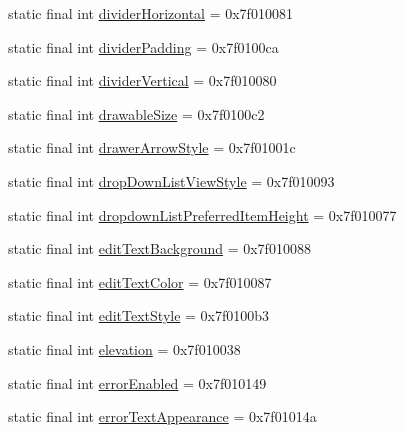 \begin{CompactItemize}
\item 
static final int \hyperlink{classandroid_1_1support_1_1v7_1_1appcompat_1_1_r_1_1attr_39fa1b4839ffb74fe8f1a5873c6bc7ed}{dividerHorizontal} = 0x7f010081
\item 
static final int \hyperlink{classandroid_1_1support_1_1v7_1_1appcompat_1_1_r_1_1attr_1d8765f66957a6fc22139ba4cc569411}{dividerPadding} = 0x7f0100ca
\item 
static final int \hyperlink{classandroid_1_1support_1_1v7_1_1appcompat_1_1_r_1_1attr_f6161dfedec9cb24c0623a20f9e6898b}{dividerVertical} = 0x7f010080
\item 
static final int \hyperlink{classandroid_1_1support_1_1v7_1_1appcompat_1_1_r_1_1attr_7fe82eb5c03945592aeb9c4992bc7256}{drawableSize} = 0x7f0100c2
\item 
static final int \hyperlink{classandroid_1_1support_1_1v7_1_1appcompat_1_1_r_1_1attr_1e11159150104ac355b55b654a2a7266}{drawerArrowStyle} = 0x7f01001c
\item 
static final int \hyperlink{classandroid_1_1support_1_1v7_1_1appcompat_1_1_r_1_1attr_dc1cf6c3f3c6407c24abba8b0296a71a}{dropDownListViewStyle} = 0x7f010093
\item 
static final int \hyperlink{classandroid_1_1support_1_1v7_1_1appcompat_1_1_r_1_1attr_c21011101e53b38d6e260f907a576eba}{dropdownListPreferredItemHeight} = 0x7f010077
\item 
static final int \hyperlink{classandroid_1_1support_1_1v7_1_1appcompat_1_1_r_1_1attr_f74b90cd065cc21a110da0715d1da7d5}{editTextBackground} = 0x7f010088
\item 
static final int \hyperlink{classandroid_1_1support_1_1v7_1_1appcompat_1_1_r_1_1attr_0500ec42007cd7fecc80662a3795ee3a}{editTextColor} = 0x7f010087
\item 
static final int \hyperlink{classandroid_1_1support_1_1v7_1_1appcompat_1_1_r_1_1attr_ffde64fe5d66d56de18fc47a97451360}{editTextStyle} = 0x7f0100b3
\item 
static final int \hyperlink{classandroid_1_1support_1_1v7_1_1appcompat_1_1_r_1_1attr_6624b199480a289dfa0b1761b4418ca2}{elevation} = 0x7f010038
\item 
static final int \hyperlink{classandroid_1_1support_1_1v7_1_1appcompat_1_1_r_1_1attr_df5e1b0166e3be1a0526c2042068804a}{errorEnabled} = 0x7f010149
\item 
static final int \hyperlink{classandroid_1_1support_1_1v7_1_1appcompat_1_1_r_1_1attr_73d883123a3a14a28f6848cacee63fb3}{errorTextAppearance} = 0x7f01014a
\item 

\end{CompactItemize}
